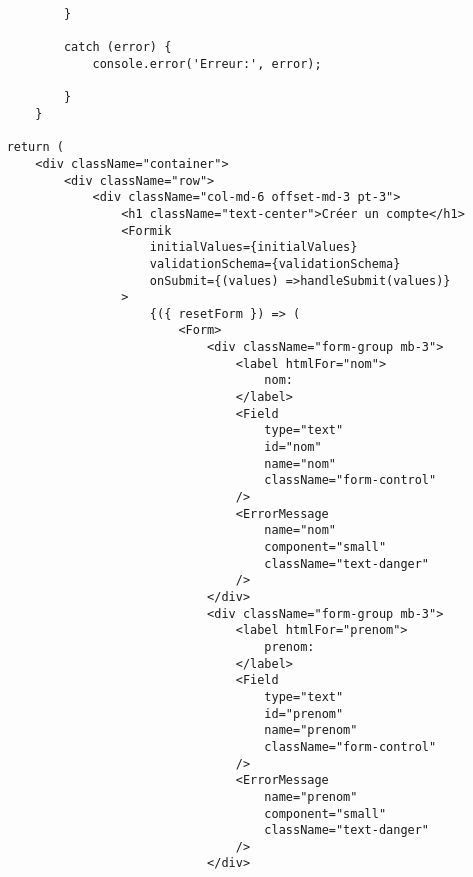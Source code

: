 \documentclass[10pt,a4paper]{article}
\begin{document}
\begin{verbatim}
            }
            
            catch (error) {
                console.error('Erreur:', error);
                
            }
        }

    return (
        <div className="container">
            <div className="row">
                <div className="col-md-6 offset-md-3 pt-3">
                    <h1 className="text-center">Créer un compte</h1>
                    <Formik
                        initialValues={initialValues}
                        validationSchema={validationSchema}
                        onSubmit={(values) =>handleSubmit(values)}
                    >
                        {({ resetForm }) => (
                            <Form>
                                <div className="form-group mb-3">
                                    <label htmlFor="nom">
                                        nom:
                                    </label>
                                    <Field
                                        type="text"
                                        id="nom"
                                        name="nom"
                                        className="form-control"
                                    />
                                    <ErrorMessage
                                        name="nom"
                                        component="small"
                                        className="text-danger"
                                    />
                                </div>
                                <div className="form-group mb-3">
                                    <label htmlFor="prenom">
                                        prenom:
                                    </label>
                                    <Field
                                        type="text"
                                        id="prenom"
                                        name="prenom"
                                        className="form-control"
                                    />
                                    <ErrorMessage
                                        name="prenom"
                                        component="small"
                                        className="text-danger"
                                    />
                                </div>
                                

\end{verbatim}
\end{document}
